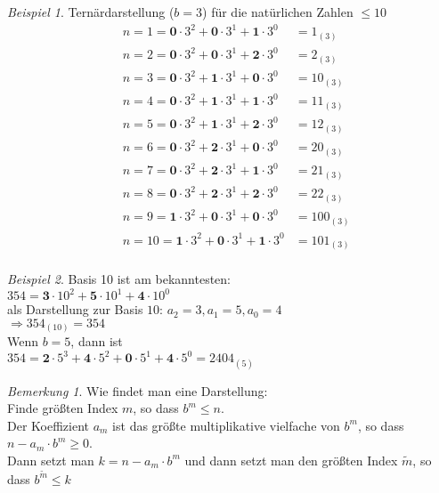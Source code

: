 \documentclass[12pt,a4paper,titlepage]{article} %
\theoremstyle{definition}
\theoremstyle{remark}
\newtheorem*{bem}{Bemerkung}
\newtheorem*{bsp}{Beispiel}
\begin{document}
	\begin{bsp}
		Ternärdarstellung (\(b = 3\)) für die natürlichen Zahlen \(\leq 10\)\\
		\begin{align*}
			&n = 1 = \textbf{0} \cdot 3^2 + \textbf{0} \cdot 3^1 + \textbf{1} \cdot 3^0 &= 1_{(3)}\\
			&n = 2 = \textbf{0} \cdot 3^2 + \textbf{0} \cdot 3^1 + \textbf{2} \cdot 3^0 &= 2_{(3)}\\
			&n = 3 = \textbf{0} \cdot 3^2 + \textbf{1} \cdot 3^1 + \textbf{0} \cdot 3^0 &= 10_{(3)}\\
			&n = 4 = \textbf{0} \cdot 3^2 + \textbf{1} \cdot 3^1 + \textbf{1} \cdot 3^0 &= 11_{(3)}\\
			&n = 5 = \textbf{0} \cdot 3^2 + \textbf{1} \cdot 3^1 + \textbf{2} \cdot 3^0 &= 12_{(3)}\\
			&n = 6 = \textbf{0} \cdot 3^2 + \textbf{2} \cdot 3^1 + \textbf{0} \cdot 3^0 &= 20_{(3)}\\
			&n = 7 = \textbf{0} \cdot 3^2 + \textbf{2} \cdot 3^1 + \textbf{1} \cdot 3^0 &= 21_{(3)}\\
			&n = 8 = \textbf{0} \cdot 3^2 + \textbf{2} \cdot 3^1 + \textbf{2} \cdot 3^0 &= 22_{(3)}\\
			&n = 9 = \textbf{1} \cdot 3^2 + \textbf{0} \cdot 3^1 + \textbf{0} \cdot 3^0 &= 100_{(3)}\\
			&n = 10 = \textbf{1} \cdot 3^2 + \textbf{0} \cdot 3^1 + \textbf{1} \cdot 3^0 &= 101_{(3)}\\
		\end{align*}
	\end{bsp}
	\begin{bsp}
		Basis 10 ist am bekanntesten:\\
		\(354 = \textbf{3} \cdot 10^2 + \textbf{5} \cdot 10^1 + \textbf{4} \cdot 10^0\)\\
		als Darstellung zur Basis \(10\): \(a_2 = 3, a_1 = 5, a_0 = 4\)\\
		\(\Rightarrow 354_{(10)} = 354\)\\
		Wenn \(b = 5\), dann ist\\
		\(354 = \textbf{2} \cdot 5^3 + \textbf{4} \cdot 5^2 + \textbf{0} \cdot 5^1 + \textbf{4} \cdot 5^0 = 2404_{(5)}\)
	\end{bsp}
	\begin{bem} %
		Wie findet man eine Darstellung:\\
		Finde größten Index \(m\), so dass \(b^m \leq n\).\\
		Der Koeffizient \(a_m\) ist das größte multiplikative vielfache von \(b^m\), so dass \(n - a_m \cdot b^m \geq 0\).\\
		Dann setzt man \(k=n-a_m \cdot b^m\) und dann setzt man den größten Index \(\tilde{m}\), so dass \(b^{\tilde{m}} \leq k\)
	\end{bem}
\end{document}
